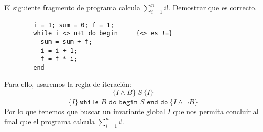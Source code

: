 \begin{ejercicio}
    El siguiente fragmento de programa calcula $\displaystyle\sum_{i=1}^{n} i!$. Demostrar que es correcto.
    \begin{verbatim}
        i = 1; sum = 0; f = 1;
        while i <> n+1 do begin     {<> es !=}
          sum = sum + f;
          i = i + 1;
          f = f * i;
        end
    \end{verbatim}
    Para ello, usaremos la regla de iteración:
    \begin{equation*}
        \dfrac{\{I \land B\}\ S\ \{I\}}{\{I\}\ \texttt{while\ } B \texttt{\ do\ begin\ } S \texttt{\ end\ do}\ \{I \land \lnot B\}}
    \end{equation*}
    Por lo que tenemos que buscar un invariante global $I$ que nos permita concluir al final que el programa calcula $\displaystyle\sum_{i=1}^{n} i!$.


\end{ejercicio}
